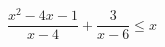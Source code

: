 \begin{ex}[type=inequality]
	\begin{condition}
		\( \dfrac{x^2-4x-1}{x-4}+\dfrac{3}{x-6}\le x \)
	\end{condition}
	\answer{\( (-\infty;3]\cup(4;6) \)}
\end{ex}